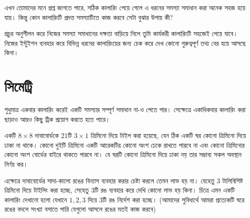 \documentclass[11pt]{report}
\begin{document}
এখন তোমাদের মনে প্রশ্ন জাগতে পারে, সঠিক কালারিং পেয়ে গেলে এ ধরনের সমস্যা সমাধান করা অনেক সহজ হয়ে যায়। কিন্তু কোন কালারিংটি প্রদত্ত সমস্যাটিতে কাজ করবে সেটা বুঝার উপায় কী?

\begin{tcolorbox}[colframe=blue!80!blue]
প্রচুর অনুশীলন করে নিজের সমস্যা সমাধানের দক্ষতা বাড়িয়ে নিলে তুমি কার্যকরী কালারিংটি সহজেই পেয়ে যাবে। নিজের ইন্টুইশন ব্যবহার করে বিভিন্ন ধরনের কালারিংয়ের জন্য চেক করে দেখ কোনো গুরুত্বপূর্ণ তথ্য বের হয়ে আসছে কিনা।
\end{tcolorbox}

\section{সিমেট্রি}

শুধুমাত্র একবার কালারিং করেই একটি সমস্যার সম্পূর্ণ সমাধান না-ও পেতে পার। সেক্ষেত্রে একাধিকবার কালারিং করা ছাড়াও আরও কিছু ট্রিক প্রয়োগ করতে হতে পারে।\\

\begin{tcolorbox}[colframe=black!80!green,title=Italy TST 1995]
একটি $8 \times 8$ দাবাবোর্ডকে $21$টি $3 \times 1$ ত্রিমিনো দিয়ে টাইল করা হয়েছে, যেন ঠিক একটি ঘর কোনো ত্রিমিনো দিয়ে ঢাকা না থাকে। কোনো দুইটি ত্রিমিনো একটি আরেকটির কোনো অংশ ঢেকে রাখতে পারবে না এবং কোনো ত্রিমিনোর কোনো অংশ বোর্ডের বাইরে থাকতে পারবে না। যে ঘরটি কোনো ত্রিমিনো দিয়ে ঢাকা নয় তার সম্ভাব্য সকল অবস্থান নির্ণয় কর।
\end{tcolorbox}

এক্ষেত্রে দাবাবোর্ডের সাদা-কালো রঙের বিন্যাস ব্যবহার করার চেষ্টা করলে তেমন লাভ হয় না। যেহেতু $3$ টালিবিশিষ্ট ত্রিমিনো দিয়ে টাইলিং করা হচ্ছে, সেহেতু $3$টি রঙ ব্যবহার করে দেখি কোনো লাভ হয় কিনা। চিত্রে এমন একটি কালারিং দেখানো হলো যেখানে $1, 2, 3$ দিয়ে $3$টি রঙ নির্দেশ করা হচ্ছে। (আমাদের সুবিধার্থে আমরা প্রত্যেকটি ঘরে রঙের বদলে সংখ্যা বসাতে পারি যেগুলো আসলে রঙের মতই কাজ করবে)

\begin{center}
\end{center}
\end{document}
